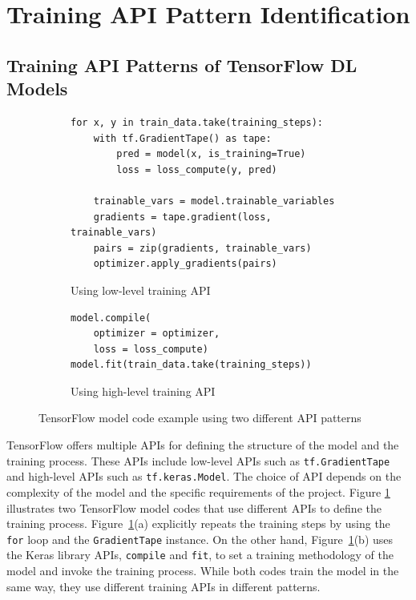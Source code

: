 \pagebreak
\section{Training API Pattern Identification}\label{sec:pattern}

\subsection{Training API Patterns of TensorFlow DL Models}

\begin{figure}[ht!]
\centering
  \begin{subfigure}[b]{\textwidth}
    \begin{lstlisting}[style=mpython]
for x, y in train_data.take(training_steps):
    with tf.GradientTape() as tape:
        pred = model(x, is_training=True)
        loss = loss_compute(y, pred)

    trainable_vars = model.trainable_variables
    gradients = tape.gradient(loss, trainable_vars)
    pairs = zip(gradients, trainable_vars)
    optimizer.apply_gradients(pairs)\end{lstlisting}
    \caption{Using low-level training API}
  \end{subfigure}
  \hspace{5mm}
  \begin{subfigure}[b]{\textwidth}
    \begin{lstlisting}[style=mpython]
model.compile(
    optimizer = optimizer, 
    loss = loss_compute) 
model.fit(train_data.take(training_steps))\end{lstlisting} 
    \caption{Using high-level training API}
  \end{subfigure}

  \caption{TensorFlow model code example using two different API patterns}
  \label{fig:pattern:ex01}
\end{figure}

TensorFlow offers multiple APIs for defining the structure of the model and the
training process. 
These APIs include low-level APIs such as {\tt tf.GradientTape} and high-level
APIs such as {\tt tf.keras.Model}.
The choice of API depends on the complexity of the model and the specific
requirements of the project.
Figure \ref{fig:pattern:ex01} illustrates two TensorFlow model codes that use
different APIs to define the training process. 
Figure~\ref{fig:pattern:ex01}(a) explicitly repeats the training
steps by using the {\tt for} loop and the {\tt GradientTape} instance. 
On the other hand, Figure~\ref{fig:pattern:ex01}(b) uses the Keras
library APIs, {\tt compile} and {\tt fit}, to set a training methodology of the
model and invoke the training process. 
While both codes train the model in the same way, they use different training
APIs in different patterns.

